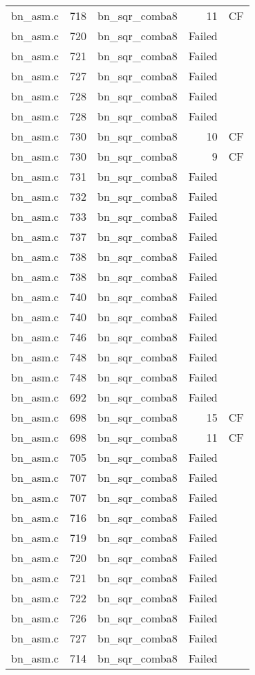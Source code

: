 \begin{table}[h]
{\begin{tabular}{clrrr}
bn\_asm.c&718&bn\_sqr\_comba8&11&CF\\
bn\_asm.c&720&bn\_sqr\_comba8&Failed&\\
bn\_asm.c&721&bn\_sqr\_comba8&Failed&\\
bn\_asm.c&727&bn\_sqr\_comba8&Failed&\\
bn\_asm.c&728&bn\_sqr\_comba8&Failed&\\
bn\_asm.c&728&bn\_sqr\_comba8&Failed&\\
bn\_asm.c&730&bn\_sqr\_comba8&10&CF\\
bn\_asm.c&730&bn\_sqr\_comba8&9 &CF\\
bn\_asm.c&731&bn\_sqr\_comba8&Failed&\\
bn\_asm.c&732&bn\_sqr\_comba8&Failed&\\
bn\_asm.c&733&bn\_sqr\_comba8&Failed&\\
bn\_asm.c&737&bn\_sqr\_comba8&Failed&\\
bn\_asm.c&738&bn\_sqr\_comba8&Failed&\\
bn\_asm.c&738&bn\_sqr\_comba8&Failed&\\
bn\_asm.c&740&bn\_sqr\_comba8&Failed&\\
bn\_asm.c&740&bn\_sqr\_comba8&Failed&\\
bn\_asm.c&746&bn\_sqr\_comba8&Failed&\\
bn\_asm.c&748&bn\_sqr\_comba8&Failed&\\
bn\_asm.c&748&bn\_sqr\_comba8&Failed&\\
bn\_asm.c&692&bn\_sqr\_comba8&Failed&\\
bn\_asm.c&698&bn\_sqr\_comba8&15&CF\\
bn\_asm.c&698&bn\_sqr\_comba8&11&CF\\
bn\_asm.c&705&bn\_sqr\_comba8&Failed&\\
bn\_asm.c&707&bn\_sqr\_comba8&Failed&\\
bn\_asm.c&707&bn\_sqr\_comba8&Failed&\\
bn\_asm.c&716&bn\_sqr\_comba8&Failed&\\
bn\_asm.c&719&bn\_sqr\_comba8&Failed&\\
bn\_asm.c&720&bn\_sqr\_comba8&Failed&\\
bn\_asm.c&721&bn\_sqr\_comba8&Failed&\\
bn\_asm.c&722&bn\_sqr\_comba8&Failed&\\
bn\_asm.c&726&bn\_sqr\_comba8&Failed&\\
bn\_asm.c&727&bn\_sqr\_comba8&Failed&\\
bn\_asm.c&714&bn\_sqr\_comba8&Failed&\\

\end{tabular}}
\end{table}
